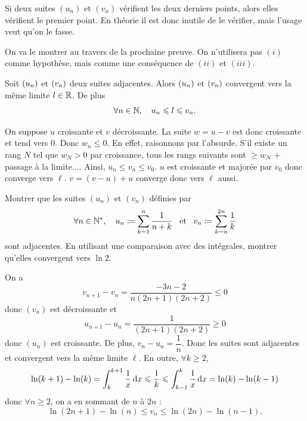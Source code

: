 \documentclass{magnolia}
\begin{document}
\begin{remarqueUnique}
\remarque Si deux suites $(u_n)$ et $(v_n)$ vérifient les deux derniers points,
  alors elles vérifient le premier point. En théorie il est donc inutile de
  le vérifier, mais l'usage veut qu'on le fasse.
\end{remarqueUnique}

\begin{sol}
On va le montrer au travers de la prochaine preuve. On n'utilisera pas $(i)$ comme hypothèse, mais comme une conséquence de $(ii)$ et $(iii)$.
\end{sol}

\begin{proposition}[utile=-3]
Soit $\left(u_n\right)$ et $\left(v_n\right)$ deux suites adjacentes. Alors $\left(u_n\right)$ et $\left(v_n\right)$
convergent vers la même limite $l\in\mathbb{R}$. De plus
\[\forall n\in\mathbb{N} ,\quad u_n \leqslant l \leqslant v_n.\]
\end{proposition}

\begin{preuve}
On suppose $u$ croissante et $v$ décroissante.
La suite $w=u-v$ est donc croissante et tend vers $0$. Donc $w_n\leq 0$. En effet, raisonnons par l'absurde. S'il existe un rang $N$ tel que $w_N>0$ par croissance, tous les rangs suivants sont $\geq w_N$ + passage à la limite.... Ainsi, $u_n\leq v_n\leq v_0$.
$u$ est croissante et majorée par $v_0$ donc converge vers $\ell$. $v=(v-u)+u$ converge donc vers $\ell$ aussi. 
\end{preuve}

\begin{exoUnique}
\exo Montrer que les suites $(u_n)$ et $(v_n)$ définies par
  \[\forall n\in{\mathbb{N}^*} ,\quad u_n\coloneqq\sum_{k=1}^n \frac{1}{n+k} \quad\!\text{et}\quad\!
    v_n\coloneqq\sum_{k=n}^{2n} \frac{1}{k}\]
  sont adjacentes. En utilisant une comparaison avec des intégrales, montrer
  qu'elles convergent vers $\ln 2$.
\end{exoUnique}

\begin{sol}
On a 
$$v_{n+1}-v_n=\frac{-3n-2}{n(2n+1)(2n+2)}\leq 0$$
donc $(v_n)$ est décroissante et $$u_{n+1}-u_n=\frac{1}{(2n+1)(2n+2)}\geq 0$$ donc $(u_n)$ est croissante. De plus, $v_n-u_n=\dfrac{1}{n}$.
Donc les suites sont adjacentes et convergent vers la même limite $\ell$.
En outre, $\forall k\geq 2$, $$\ln(k+1)-\ln(k)=\int_{k}^{k+1} \frac{1}{x}\,\text{d}x\leqslant \frac{1}{k} \leqslant \int_{k-1}^{k} \frac{1}{x}\,\text{d}x=\ln(k)-\ln(k-1)$$ donc $\forall n\geq 2$, on a en sommant de $n$ à $2n$ :
$$\ln(2n+1)-\ln(n)\leq v_n \leq \ln(2n)-\ln(n-1).$$
\end{sol}
\end{document}
